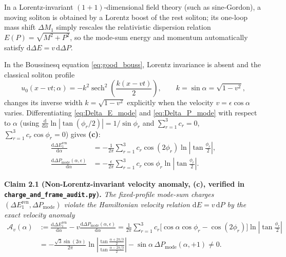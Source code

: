 \documentclass[11pt,a4paper]{article}
\newcommand{\dd}{\mathrm{d}}
\begin{document}
In a Lorentz-invariant $(1+1)$-dimensional field theory (such as sine-Gordon), a
moving soliton is obtained by a Lorentz boost of the rest soliton; its one-loop
mass shift $\Delta M_1$ simply rescales the relativistic dispersion relation
$E(P) = \sqrt{M^2 + P^2}$, so the mode-sum energy and momentum automatically
satisfy $\dd\Delta E = v\,\dd\Delta P$.

In the Boussinesq equation \eqref{eq:good_bouss}, Lorentz invariance is absent
and the classical soliton profile
\begin{equation}
  u_0(x-vt;\alpha) = -k^2\operatorname{sech}^2\!\left(\frac{k(x-vt)}{2}\right), \qquad
  k = \sin\alpha = \sqrt{1-v^2},
  \label{eq:profile}
\end{equation}
changes its inverse width $k = \sqrt{1-v^2}$ explicitly when the velocity
$v = \epsilon\cos\alpha$ varies. Differentiating \eqref{eq:Delta_E_mode} and
\eqref{eq:Delta_P_mode} with respect to $\alpha$ (using $\frac{\dd}{\dd\alpha}\ln|\tan(\phi_r/2)| = 1/\sin\phi_r$
and $\sum_{r=1}^3 c_r = 0$, $\sum_{r=1}^3 c_r\cos\phi_r = 0$) gives \textbf{(c)}:
\begin{align}
  \frac{\dd\Delta E_1^{\mathrm{ren}}}{\dd\alpha}
  &= -\frac{1}{2\pi}\sum_{r=1}^3 c_r\cos(2\phi_r)\ln\!\left|\tan\frac{\phi_r}{2}\right|,
  \label{eq:dE_dalpha} \\
  \frac{\dd\Delta P_{\mathrm{mode}}(\alpha,\epsilon)}{\dd\alpha}
  &= -\frac{\epsilon}{2\pi}\sum_{r=1}^3 c_r\cos\phi_r\ln\!\left|\tan\frac{\phi_r}{2}\right|.
  \label{eq:dP_dalpha}
\end{align}

\medskip\noindent
\textbf{Claim 2.1 (Non-Lorentz-invariant velocity anomaly, \textbf{(c)}, verified in \texttt{charge\_and\_frame\_audit.py}).}
\emph{The fixed-profile mode-sum charges $(\Delta E_1^{\mathrm{ren}},\Delta P_{\mathrm{mode}})$
violate the Hamiltonian velocity relation $\dd E = v\,\dd P$ by the exact
velocity anomaly}
\begin{align}
  \mathcal{A}_v(\alpha)
  &:= \frac{\dd\Delta E_1^{\mathrm{ren}}}{\dd\alpha}
      - v\frac{\dd\Delta P_{\mathrm{mode}}(\alpha,\epsilon)}{\dd\alpha}
  = \frac{1}{2\pi}\sum_{r=1}^3 c_r\big[\cos\alpha\cos\phi_r - \cos(2\phi_r)\big]\ln\!\left|\tan\frac{\phi_r}{2}\right|
  \nonumber \\
  &= -\frac{\sqrt{3}\sin(2\alpha)}{2\pi}\ln\!\left|\frac{\tan\frac{\alpha+2\pi/3}{2}}{\tan\frac{\alpha-2\pi/3}{2}}\right|
     - \sin\alpha\,\Delta P_{\mathrm{mode}}(\alpha,+1) \neq 0.
  \label{eq:velocity_anomaly}
\end{align}
\end{document}
